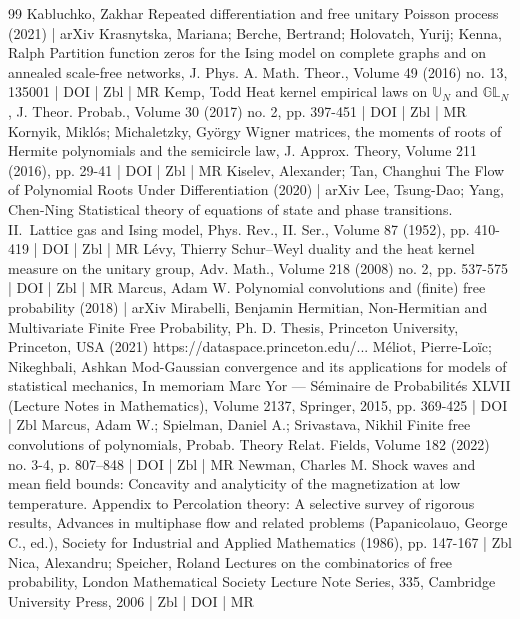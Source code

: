 \begin{thebibliography}{99}
Kabluchko, Zakhar Repeated differentiation and free unitary Poisson process (2021) | arXiv
Krasnytska, Mariana; Berche, Bertrand; Holovatch, Yurij; Kenna, Ralph Partition function zeros for the Ising model on complete graphs and on annealed scale-free networks, J. Phys. A. Math. Theor., Volume 49 (2016) no. 13, 135001 | DOI | Zbl | MR
Kemp, Todd Heat kernel empirical laws on $\mathbb{U}_{N}$ and $\mathbb{GL}_{N}$, J. Theor. Probab., Volume 30 (2017) no. 2, pp. 397-451 | DOI | Zbl | MR
Kornyik, Miklós; Michaletzky, György Wigner matrices, the moments of roots of Hermite polynomials and the semicircle law, J. Approx. Theory, Volume 211 (2016), pp. 29-41 | DOI | Zbl | MR
Kiselev, Alexander; Tan, Changhui The Flow of Polynomial Roots Under Differentiation (2020) | arXiv
Lee, Tsung-Dao; Yang, Chen-Ning Statistical theory of equations of state and phase transitions. II. Lattice gas and Ising model, Phys. Rev., II. Ser., Volume 87 (1952), pp. 410-419 | DOI | Zbl | MR
Lévy, Thierry Schur–Weyl duality and the heat kernel measure on the unitary group, Adv. Math., Volume 218 (2008) no. 2, pp. 537-575 | DOI | Zbl | MR
Marcus, Adam W. Polynomial convolutions and (finite) free probability (2018) | arXiv
Mirabelli, Benjamin Hermitian, Non-Hermitian and Multivariate Finite Free Probability, Ph. D. Thesis, Princeton University, Princeton, USA (2021) https://dataspace.princeton.edu/...
Méliot, Pierre-Loïc; Nikeghbali, Ashkan Mod-Gaussian convergence and its applications for models of statistical mechanics, In memoriam Marc Yor — Séminaire de Probabilités XLVII (Lecture Notes in Mathematics), Volume 2137, Springer, 2015, pp. 369-425 | DOI | Zbl
Marcus, Adam W.; Spielman, Daniel A.; Srivastava, Nikhil Finite free convolutions of polynomials, Probab. Theory Relat. Fields, Volume 182 (2022) no. 3-4, p. 807–848 | DOI | Zbl | MR
Newman, Charles M. Shock waves and mean field bounds: Concavity and analyticity of the magnetization at low temperature. Appendix to Percolation theory: A selective survey of rigorous results, Advances in multiphase flow and related problems (Papanicolauo, George C., ed.), Society for Industrial and Applied Mathematics (1986), pp. 147-167 | Zbl
Nica, Alexandru; Speicher, Roland Lectures on the combinatorics of free probability, London Mathematical Society Lecture Note Series, 335, Cambridge University Press, 2006 | Zbl | DOI | MR

\end{thebibliography}
